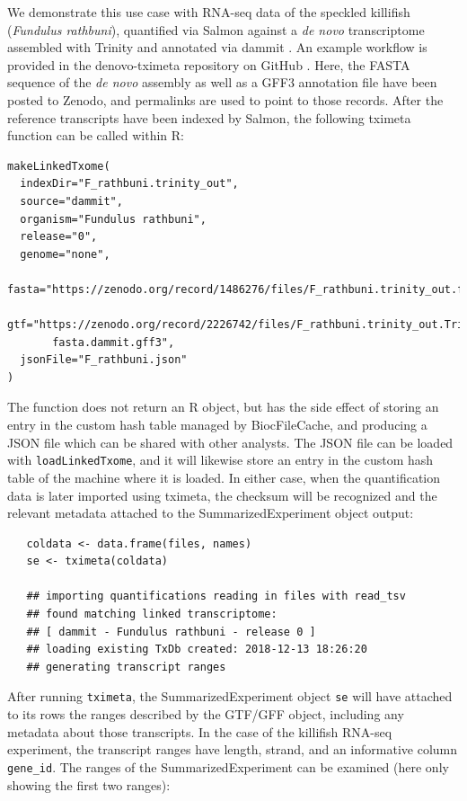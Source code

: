 \documentclass[12pt]{article} \usepackage[utf8]{inputenc}
\begin{document}
We demonstrate this use case with RNA-seq data of the speckled
killifish (\textit{Fundulus rathbuni}), quantified via Salmon
\citep{salmon} against a \textit{de novo} transcriptome assembled with
Trinity \citep{trinity} and annotated via dammit \citep{dammit}. An
example workflow is provided in the denovo-tximeta repository on
GitHub \citep{denovo}. Here, the FASTA sequence of the
\textit{de novo} assembly as well as a GFF3 annotation file have been
posted to Zenodo, and permalinks are used to point to those
records. After the reference transcripts have been indexed by Salmon,
the following tximeta function can be called within R:

\begin{verbatim}
makeLinkedTxome(
  indexDir="F_rathbuni.trinity_out", 
  source="dammit",
  organism="Fundulus rathbuni", 
  release="0", 
  genome="none",
  fasta="https://zenodo.org/record/1486276/files/F_rathbuni.trinity_out.fasta",
  gtf="https://zenodo.org/record/2226742/files/F_rathbuni.trinity_out.Trinity.
       fasta.dammit.gff3",
  jsonFile="F_rathbuni.json"
)
\end{verbatim}

The function does not return an R object, but has the side effect of
storing an entry in the custom hash table managed by BiocFileCache,
and producing a JSON file which can be shared with other analysts. The
JSON file can be loaded with \texttt{loadLinkedTxome}, and it will
likewise store an entry in the custom hash table of the machine where
it is loaded. In either case, when the quantification data is later
imported using tximeta, the checksum will be recognized and the
relevant metadata attached to the SummarizedExperiment object output:

\begin{verbatim}
   coldata <- data.frame(files, names) 
   se <- tximeta(coldata)

   ## importing quantifications reading in files with read_tsv
   ## found matching linked transcriptome: 
   ## [ dammit - Fundulus rathbuni - release 0 ] 
   ## loading existing TxDb created: 2018-12-13 18:26:20 
   ## generating transcript ranges
\end{verbatim}

After running \texttt{tximeta}, the SummarizedExperiment object
\texttt{se} will have attached to its rows the ranges described by the
GTF/GFF object, including any metadata about those transcripts. In the
case of the killifish RNA-seq experiment, the transcript ranges have
length, strand, and an informative column \texttt{gene\_id}. The ranges
of the SummarizedExperiment can be examined (here only showing the first
two ranges):
\end{document}
